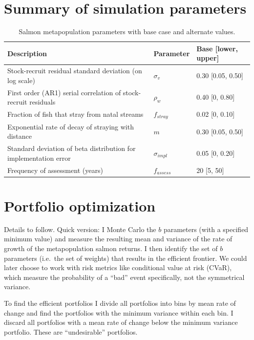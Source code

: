 \documentclass[12pt]{article}
\begin{document}
\section{Summary of simulation parameters}

\begin{table}[h!]
\centering
\small
\caption{Salmon metapopulation parameters with base case and alternate values.}
\begin{tabular}{p{7.0cm}p{1.6cm}p{3.2cm}}
\toprule
Description & Parameter & Base [lower, upper] \\
\midrule
Stock-recruit residual standard deviation (on log scale) & $\sigma_v$ & 0.30 [0.05, 0.50] \\
First order (AR1) serial correlation of stock-recruit residuals & $\rho_w$ & 0.40 [0, 0.80] \\
Fraction of fish that stray from natal streams & $f_{stray}$ & 0.02 [0, 0.10] \\
Exponential rate of decay of straying with distance & $m$ & 0.30 [0.05, 0.50] \\
Standard deviation of beta distribution for implementation error & $\sigma_{impl}$ & 0.05 [0, 0.20] \\
Frequency of assessment (years) & $f_{assess}$ & 20 [5, 50] \\
\bottomrule
\end{tabular}
\label{tab:salm-pars}
\end{table}

\clearpage

\section{Portfolio optimization}

Details to follow. Quick version: I Monte Carlo the $b$ parameters (with
a specified minimum value) and measure the resulting mean and variance
of the rate of growth of the metapopulation salmon returns. I then
identify the set of $b$ parameters (i.e.~the set of weights) that
results in the efficient frontier. We could later choose to work with
risk metrics like conditional value at risk (CVaR), which measure the
probability of a ``bad'' event specifically, not the symmetrical
variance.

To find the efficient portfolios I divide all portfolios into bins by
mean rate of change and find the portfolios with the minimum variance
within each bin. I discard all portfolios with a mean rate of change
below the minimum variance portfolio. These are ``undesirable''
portfolios.
\end{document}
